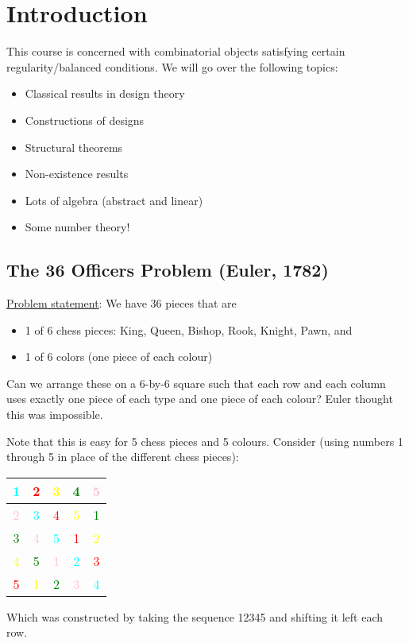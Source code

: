 
\section{Introduction}

This course is concerned with combinatorial objects satisfying certain regularity/balanced conditions.
We will go over the following topics:
\begin{itemize}
    \item Classical results in design theory
    \item Constructions of designs
    \item Structural theorems
    \item Non-existence results
    \item Lots of algebra (abstract and linear)
    \item Some number theory!
\end{itemize}

\subsection{The 36 Officers Problem (Euler, 1782)}
\ul{Problem statement}: We have 36 pieces that are 
\begin{itemize}
    \item 1 of 6 chess pieces: King, Queen, Bishop, Rook, Knight, Pawn, and
    \item 1 of 6 colors (one piece of each colour)
\end{itemize}

Can we arrange these on a 6-by-6 square such that each row and each column uses exactly one piece of each type and one piece of each colour?
Euler thought this was impossible.

Note that this is easy for 5 chess pieces and 5 colours.
Consider (using numbers 1 through 5 in place of the different chess pieces):
\begin{center}
    \begin{tabular}{|c|c|c|c|c|}
        \hline
        \textcolor{cyan}{1} & \textcolor{red}{2} & \textcolor{yellow}{3} & \textcolor{green}{4} & \textcolor{pink}{5} \\
        \hline
        \textcolor{pink}{2} & \textcolor{cyan}{3} & \textcolor{red}{4} & \textcolor{yellow}{5} & \textcolor{green}{1} \\ 
        \hline
        \textcolor{green}{3} & \textcolor{pink}{4} & \textcolor{cyan}{5} & \textcolor{red}{1} & \textcolor{yellow}{2} \\ 
        \hline
        \textcolor{yellow}{4} & \textcolor{green}{5} & \textcolor{pink}{1} & \textcolor{cyan}{2} & \textcolor{red}{3} \\ 
        \hline
        \textcolor{red}{5} & \textcolor{yellow}{1} & \textcolor{green}{2} & \textcolor{pink}{3} & \textcolor{cyan}{4} \\ 
        \hline
    \end{tabular}
\end{center}
Which was constructed by taking the sequence 12345 and shifting it left each row.

